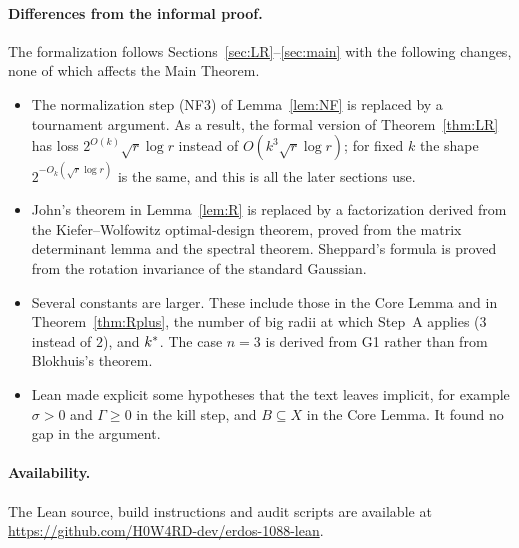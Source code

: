 \begin{sloppypar}
\paragraph{Differences from the informal proof.} The formalization follows Sections~\ref{sec:LR}--\ref{sec:main}
with the following changes, none of which affects the Main Theorem.
\begin{itemize}[leftmargin=1.5em]
\item The normalization step (NF3) of Lemma~\ref{lem:NF} is replaced by a tournament argument. As a result, the formal
  version of Theorem~\ref{thm:LR} has loss $2^{O(k)}\sqrt r\log r$ instead of $O(k^3\sqrt r\log r)$; for fixed $k$ the
  shape $2^{-O_k(\sqrt r\log r)}$ is the same, and this is all the later sections use.
\item John's theorem in Lemma~\ref{lem:R} is replaced by a factorization derived from the Kiefer--Wolfowitz
  optimal-design theorem, proved from the matrix determinant lemma and the spectral theorem. Sheppard's formula is
  proved from the rotation invariance of the standard Gaussian.
\item Several constants are larger. These include those in the Core Lemma and in Theorem~\ref{thm:Rplus}, the
  number of big radii at which Step~A applies ($3$ instead of $2$), and $k^{\ast}$. The case $n=3$ is derived from G1
  rather than from Blokhuis's theorem.
\item Lean made explicit some hypotheses that the text leaves implicit, for example $\sigma>0$ and $\Gamma\ge 0$ in
  the kill step, and $B\subseteq X$ in the Core Lemma. It found no gap in the argument.
\end{itemize}

\paragraph{Availability.} The Lean source, build instructions and audit scripts are available at
\url{https://github.com/H0W4RD-dev/erdos-1088-lean}.
\end{sloppypar}
